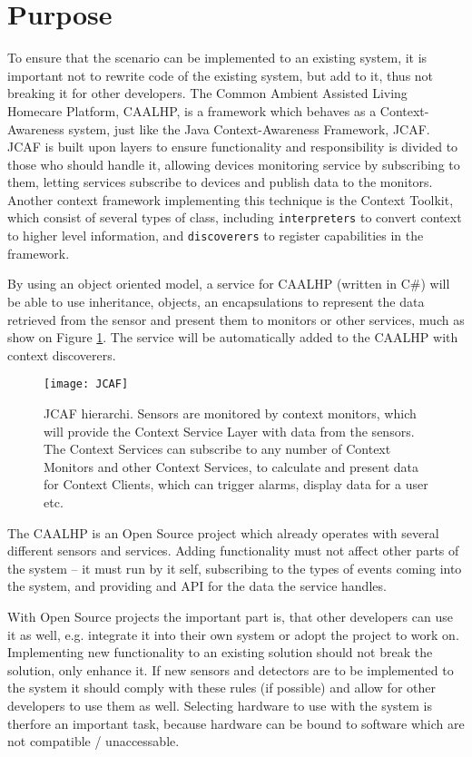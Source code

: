\section{Purpose}

To ensure that the scenario can be implemented to an existing system, it is important not to rewrite code of the existing system, but add to it, thus not breaking it for other developers.
The Common Ambient Assisted Living Homecare Platform, CAALHP, is a framework which behaves as a Context-Awareness system, just like the Java Context-Awareness Framework\cite{JCAF}, JCAF.
JCAF is built upon layers to ensure functionality and responsibility is divided to those who should handle it, allowing devices monitoring service by subscribing to them, letting services subscribe to devices and publish data to the monitors.
Another context framework implementing this technique is the Context Toolkit\cite{ContextToolkit}, which consist of several types of class, including \texttt{interpreters} to convert context to higher level information, and \texttt{discoverers} to register capabilities in the framework.

By using an object oriented model, a service for CAALHP (written in C\#) will be able to use inheritance, objects, an encapsulations to represent the data retrieved from the sensor and present them to monitors or other services, much as show on Figure \ref{fig:JCAF}.
The service will be automatically added to the CAALHP with context discoverers.

\begin{figure}[hbtp]
	\centering
	\texttt{[image: JCAF]}
	\caption{JCAF hierarchi\cite[5]{JCAF}. 
	Sensors are monitored by context monitors, which will provide the Context Service Layer with data from the sensors.
	The Context Services can subscribe to any number of Context Monitors and other Context Services, to calculate and present data for Context Clients, which can trigger alarms, display data for a user etc.}
	\label{fig:JCAF}
\end{figure}

The CAALHP is an Open Source project\cite{BB-CAALHP} which already operates with several different sensors and services.
Adding functionality must not affect other parts of the system -- it must run by it self, subscribing to the types of events coming into the system, and providing and API for the data the service handles.

With Open Source projects the important part is, that other developers can use it as well, e.g. integrate it into their own system or adopt the project to work on.
Implementing new functionality to an existing solution should not break the solution, only enhance it. 
If new sensors and detectors are to be implemented to the system it should comply with these rules (if possible) and allow for other developers to use them as well.
Selecting hardware to use with the system is therfore an important task, because hardware can be bound to software which are not compatible / unaccessable.

